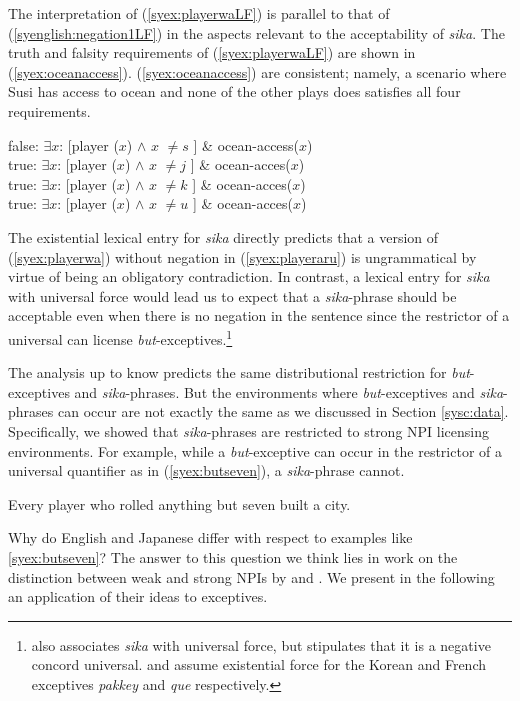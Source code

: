 \documentclass[output=paper,colorlinks,citecolor=brown,
]{langscibook}
\begin{document}
The interpretation of (\ref{syex:playerwaLF}) is parallel to that of (\ref{syenglish:negation1LF}) in the aspects relevant to the acceptability of \emph{sika}.
The truth and falsity requirements of (\ref{syex:playerwaLF}) are shown in (\ref{syex:oceanaccess}).
(\ref{syex:oceanaccess}) are consistent; namely, a scenario where Susi has  access to ocean and none of the other plays does satisfies all four requirements.

\ea \label{syex:oceanaccess}
    false: $\exists x$: [player ($x$) $\land$ $x$ $\neq s$ ] \& ocean-access($x$)\\
    true: $\exists x$: [player ($x$) $\land$ $x$ $\neq j$ ] \& ocean-acces($x$)\\
	  true: $\exists x$: [player ($x$) $\land$ $x$ $\neq k$ ] \& ocean-acces($x$)\\
    true: $\exists x$: [player ($x$) $\land$ $x$ $\neq u$ ] \& ocean-acces($x$)\z


The existential lexical entry for \emph{sika} directly predicts that a version of (\ref{syex:playerwa}) without negation in (\ref{syex:playeraru}) is ungrammatical by virtue of being an obligatory contradiction. In contrast, a lexical entry for \emph{sika} with universal force \citep{alonso-ovalle04a,kawahara08a,yoshimura06a} would lead us to expect that a \emph{sika}-phrase should be acceptable even when there is no negation in the sentence since the restrictor of a universal can license \emph{but}-exceptives.\footnote{\cite{shimoyama11} also associates \emph{sika} with universal force, but stipulates that it is a negative concord universal.  \cite{sells01a} and \cite{fintel07a} assume existential force for the Korean and French exceptives \emph{pakkey} and \emph{que} respectively.} 

The analysis up to know predicts the same distributional restriction for \emph{but}-exceptives and \emph{sika}-phrases.
But the environments where \emph{but}-exceptives and \emph{sika}-phrases can occur are not exactly the same as we discussed in Section \ref{sysc:data}.
Specifically, we showed that \emph{sika}-phrases are restricted to strong NPI licensing environments. 
For example,  while a \emph{but}-exceptive can occur in the restrictor of a universal quantifier as in (\ref{syex:butseven}), a \emph{sika}-phrase cannot.

\ea \label{syex:butseven}
Every player who rolled anything but seven built a city.\z

Why do English and Japanese differ with respect to examples like \ref{syex:butseven}?
The answer to this question we think lies in work on the distinction between weak and strong NPIs by \cite{gajewski11a} and \cite{chierchia13a}.
We present in the following an application of their ideas to exceptives.  
\end{document}
